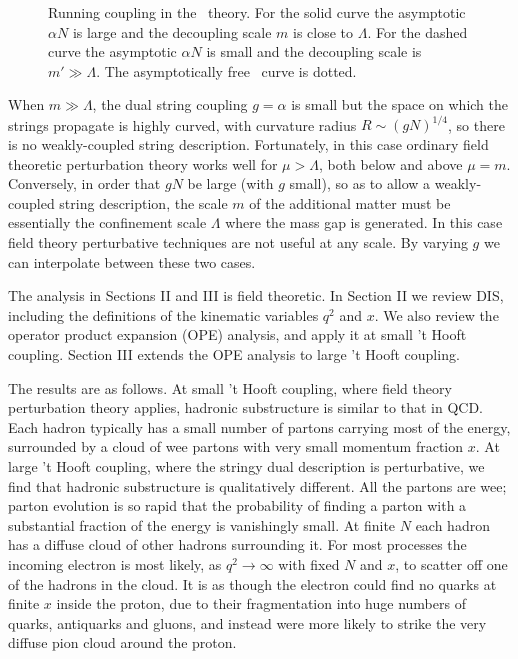 \begin{figure}[h]
\begin{center}
\leavevmode
{}
\end{center}
\caption{Running coupling in the \nonestar\ theory.  For the solid
curve the asymptotic $\alpha N$ is large and the decoupling scale $m$ is
close to $\Lambda$.  For the dashed curve the asymptotic $\alpha N$ is
small and the decoupling scale is $m' \gg\Lambda$.  The asymptotically
free \none\ curve is dotted.}
\end{figure}
When $m\gg\Lambda$, the dual string coupling $g=\alpha$ is small but
the space on which the strings propagate is highly curved,
with curvature radius $R\sim (gN)^{1/4}$, so there is no
weakly-coupled string description.  Fortunately, in this case ordinary
field theoretic perturbation theory works well for $\mu>\Lambda$, both
below and above $\mu=m$.   Conversely, in order that $g N$ be
large (with $g$ small), so as to allow a weakly-coupled string
description, the scale $m$ of the additional matter must be
essentially the confinement scale $\Lambda$ where the mass gap is
generated.  In this case field theory perturbative techniques are
not useful at any scale.  By varying $g$ we can interpolate between
these two cases.

The analysis in Sections II and III is field theoretic.
In Section II we review DIS, including the definitions of the kinematic
variables $q^2$ and $x$.  We also review the operator product expansion
(OPE) analysis, and apply it at small 't Hooft coupling.  Section III
extends the OPE analysis to large 't Hooft coupling.

The results are as
follows.  At small 't Hooft coupling, where field theory perturbation
theory applies, hadronic substructure is similar to that in QCD. Each
hadron typically has a small number of partons carrying most of the
energy, surrounded by a cloud of wee partons with very small
momentum fraction $x$.  At large 't Hooft coupling, where the stringy
dual description is perturbative, we find that hadronic substructure is
qualitatively different.  All the partons are wee; parton evolution is
so rapid that the probability of finding a parton with a substantial
fraction of the energy is vanishingly small.  At finite $N$ each hadron
has a diffuse cloud of other hadrons surrounding it.  For most
processes the incoming electron is most likely, as  $q^2\to \infty$ 
with fixed $N$
and
$x$, to scatter off one of the hadrons in the
cloud.  It is as though the electron could find no quarks at finite $x$
inside the proton, due to their fragmentation into huge numbers of
quarks, antiquarks and gluons, and instead were more likely to strike
the very diffuse pion cloud around the proton.

